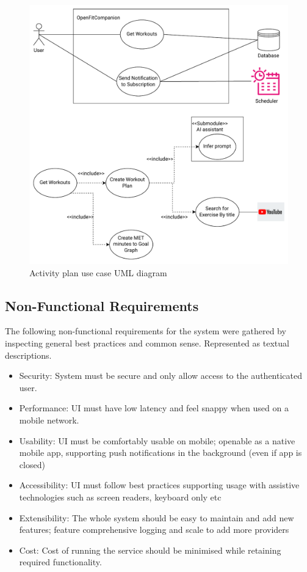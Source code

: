 \begin{figure}
    \centering
    \includegraphics[width=\textwidth,height=\textheight,keepaspectratio]{../images/workouts.pdf}
    \caption{Activity plan use case UML diagram}
    \label{fig:6}
\end{figure}
\subsection{Non-Functional Requirements}
The following non-functional requirements for the system were gathered by inspecting general best practices and common sense. Represented as textual descriptions. 
\begin{itemize}
    \item Security: System must be secure and only allow access to the authenticated user. 
    \item Performance: UI must have low latency and feel snappy when used on a mobile network. 
    \item Usability: UI must be comfortably usable on mobile; openable as a native mobile app, supporting push notifications in the background (even if app is closed)
    \item Accessibility: UI must follow best practices supporting usage with assistive technologies such as screen readers, keyboard only etc
    \item Extensibility: The whole system should be easy to maintain and add new features; feature comprehensive logging and scale to add more providers
    \item Cost: Cost of running the service should be minimised while retaining required functionality.
\end{itemize}
